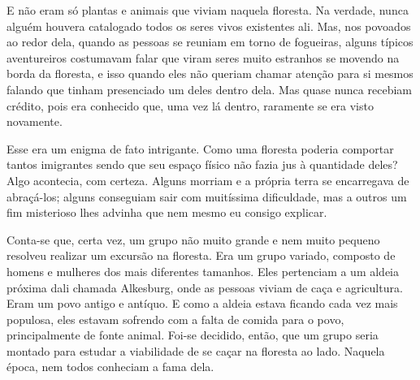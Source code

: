 E não eram só plantas e animais que viviam naquela floresta. Na verdade, nunca alguém houvera catalogado todos os seres vivos existentes ali. Mas, nos povoados ao redor dela, quando as pessoas se reuniam em torno de fogueiras, alguns típicos aventureiros costumavam falar que viram seres muito estranhos se movendo na borda da floresta, e isso quando eles não queriam chamar atenção para si mesmos falando que tinham presenciado um deles dentro dela. Mas quase nunca recebiam crédito, pois era conhecido que, uma vez lá dentro, raramente se era visto novamente.

Esse era um enigma de fato intrigante. Como uma floresta poderia comportar tantos imigrantes sendo que seu espaço físico não fazia jus à quantidade deles? Algo acontecia, com certeza. Alguns morriam e a própria terra se encarregava de abraçá-los; alguns conseguiam sair com muitíssima dificuldade, mas a outros um fim misterioso lhes advinha que nem mesmo eu consigo explicar.

Conta-se que, certa vez, um grupo não muito grande e nem muito pequeno resolveu realizar um excursão na floresta. Era um grupo variado, composto de homens e mulheres dos mais diferentes tamanhos. Eles pertenciam a um aldeia próxima dali chamada Alkesburg, onde as pessoas viviam de caça e agricultura. Eram um povo antigo e antíquo. E como a aldeia estava ficando cada vez mais populosa, eles estavam sofrendo com a falta de comida para o povo, principalmente de fonte animal. Foi-se decidido, então, que um grupo seria montado para estudar a viabilidade de se caçar na floresta ao lado. Naquela época, nem todos conheciam a fama dela.